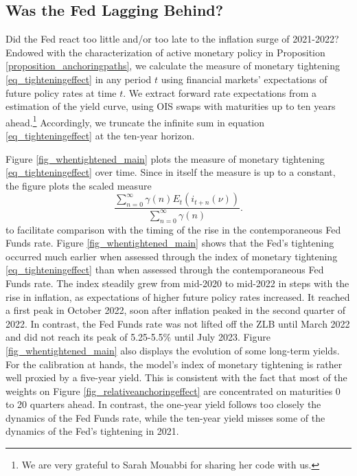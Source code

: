 \documentclass{article}
\begin{document}
\subsection{Was the Fed Lagging Behind?}\label{sec_laggingbehind}
Did the Fed react too little and/or too late to the inflation surge of 2021-2022? Endowed with the characterization of active monetary policy in Proposition \ref{proposition_anchoringpaths},
we calculate the measure of monetary tightening \eqref{eq_tighteningeffect} in any period $t$ using financial markets' expectations of future policy rates at time $t$. We extract forward rate expectations from a \cite{NelsonSiegel1987} estimation of the yield curve, using OIS swaps with maturities up to ten years ahead.\footnote{We are very grateful to Sarah Mouabbi for sharing her code with us.} Accordingly, we truncate the infinite sum in equation \eqref{eq_tighteningeffect} at the ten-year horizon.

Figure \ref{fig_whentightened_main} plots the measure of monetary tightening \eqref{eq_tighteningeffect} over time. Since in itself the measure is up to a constant, the figure plots the scaled measure
\begin{equation}
\frac{\sum_{n=0}^{\infty} \gamma(n) E_t(i_{t+n}(\nu))}{\sum_{n=0}^{\infty} \gamma(n)}.\label{eq_tighteningeffect_scaled}
\end{equation}
to facilitate comparison with the timing of the rise in the contemporaneous Fed Funds rate.
Figure \ref{fig_whentightened_main} shows that the Fed's tightening occurred much earlier when assessed through the index of monetary tightening \eqref{eq_tighteningeffect} than when assessed through the contemporaneous Fed Funds rate. The index steadily grew from mid-2020 to mid-2022 in steps with the rise in inflation, as expectations of higher future policy rates increased. It reached a first peak in October 2022, soon after inflation peaked in the second quarter of 2022. In contrast, the Fed Funds rate was not lifted off the ZLB until March 2022 and did not reach its peak of 5.25-5.5\% until July 2023. Figure \ref{fig_whentightened_main} also displays the evolution of some long-term yields. For the calibration at hands, the model's index of monetary tightening is rather well proxied by a five-year yield. This is consistent with the fact that most of the weights on Figure \ref{fig_relativeanchoringeffect} are concentrated on maturities 0 to 20 quarters ahead. In contrast, the one-year yield follows too closely the dynamics of the Fed Funds rate, while the ten-year yield misses some of the dynamics of the Fed's tightening in 2021.
\end{document}
